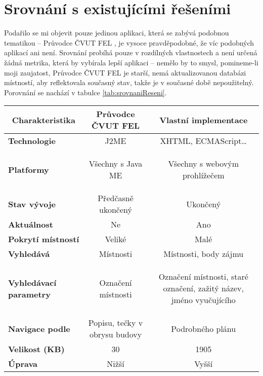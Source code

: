 \section{Srovnání s existujícími řešeními}
Podařilo se mi objevit pouze jedinou aplikaci, která se zabývá podobnou tematikou -- Průvodce ČVUT FEL \cite{PruvodceCvut}, je vysoce pravděpodobné, že víc podobných aplikací ani není. Srovnání probíhá pouze v rozdílných vlastnostech a není určená žádná metrika, která by vybírala lepší aplikaci -- nemělo by to smysl, pomineme-li moji zaujatost, Průvodce ČVUT FEL je starší, nemá aktualizovanou databázi místností, aby reflektovala současný stav, takže je v současné době nepoužitelný. Porovnání se nachází v tabulce \ref{tab:srovnaniReseni}.
\begin{table}
\begin{center}
\begin{threeparttable}
\begin{tabular}{|l|c|c|}
\hline
\multicolumn{1}{|c|}{\textbf{Charakteristika}} & \textbf{Průvodce ČVUT FEL} & \textbf{Vlastní implementace} \\
\hline
\textbf{Technologie} & J2ME & XHTML, ECMAScript\dots \\
\textbf{Platformy} & Všechny s Java ME & \parbox{1.8in}{\vspace{3pt}\begin{center}Všechny s webovým prohlížečem\end{center}\vspace{3pt}} \\
\textbf{Stav vývoje} & Předčasně ukončený & Ukončený \\
\textbf{Aktuálnost} & Ne & Ano \\
\textbf{Pokrytí místností} & Veliké & Malé \\
\textbf{Vyhledává} & Místnosti & Místnosti, body zájmu \\
\textbf{Vyhledávací parametry} & Označení místnosti & \parbox{1.8in}{\vspace{3pt}\begin{center}Označení místnosti, staré označení, zažitý název, jméno vyučujícího\end{center}\vspace{3pt}} \\
\textbf{Navigace podle} & Popisu, tečky v obrysu budovy & Podrobného plánu \\
\textbf{Velikost (KB)} & 30 & 1905 \\
\textbf{Úprava} & Nižší & Vyšší \\

\end{tabular}
\end{threeparttable}
\end{center}
\end{table}
